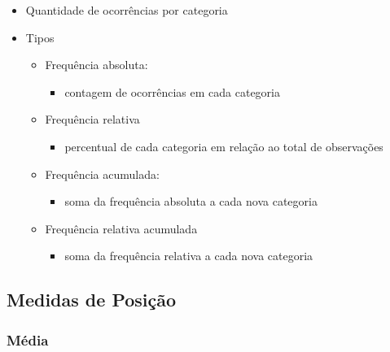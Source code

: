 \documentclass[
  letterpaper,
  DIV=11,
  numbers=noendperiod]{scrreprt}
\providecommand{\tightlist}{%
  \setlength{\itemsep}{0pt}\setlength{\parskip}{0pt}}\usepackage{longtable,booktabs,array}
\begin{document}
\begin{itemize}
\item
  Quantidade de ocorrências por categoria
\item
  Tipos

  \begin{itemize}
  \tightlist
  \item
    Frequência absoluta:

    \begin{itemize}
    \tightlist
    \item
      contagem de ocorrências em cada categoria
    \end{itemize}
  \item
    Frequência relativa

    \begin{itemize}
    \tightlist
    \item
      percentual de cada categoria em relação ao total de observações
    \end{itemize}
  \item
    Frequência acumulada:

    \begin{itemize}
    \tightlist
    \item
      soma da frequência absoluta a cada nova categoria
    \end{itemize}
  \item
    Frequência relativa acumulada

    \begin{itemize}
    \tightlist
    \item
      soma da frequência relativa a cada nova categoria
    \end{itemize}
  \end{itemize}
\end{itemize}

\hypertarget{medidas-de-posiuxe7uxe3o}{%
\subsection{Medidas de Posição}\label{medidas-de-posiuxe7uxe3o}}

\hypertarget{muxe9dia}{%
\subsubsection{Média}\label{muxe9dia}}
\end{document}
